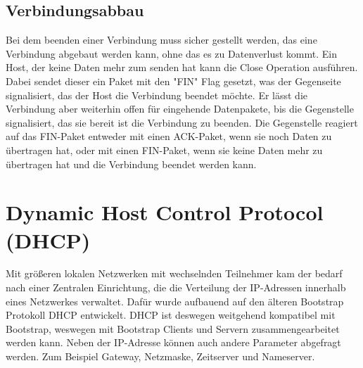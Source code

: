 \subsection{Verbindungsabbau}
Bei dem beenden einer Verbindung muss sicher gestellt werden, das eine Verbindung abgebaut werden kann, ohne das es zu Datenverlust kommt. Ein Host, der keine Daten mehr zum senden hat kann die Close Operation ausführen. Dabei sendet dieser ein Paket mit den "FIN"{} Flag gesetzt, was der Gegenseite signalisiert, das der Host die Verbindung beendet möchte. Er lässt die Verbindung aber weiterhin offen für eingehende Datenpakete, bis die Gegenstelle signalisiert, das sie bereit ist die Verbindung zu beenden. Die Gegenstelle reagiert auf das FIN-Paket entweder mit einen ACK-Paket, wenn sie noch Daten zu übertragen hat, oder mit einen FIN-Paket, wenn sie keine Daten mehr zu übertragen hat und die Verbindung beendet werden kann. 

\section{Dynamic Host Control Protocol (DHCP)}
Mit größeren lokalen Netzwerken mit wechselnden Teilnehmer kam der bedarf nach einer Zentralen Einrichtung, die die Verteilung der IP-Adressen innerhalb eines Netzwerkes verwaltet. Dafür wurde aufbauend auf den älteren Bootstrap Protokoll DHCP entwickelt. DHCP ist deswegen weitgehend kompatibel mit Bootstrap, weswegen mit Bootstrap Clients und Servern zusammengearbeitet werden kann. 
Neben der IP-Adresse können auch andere Parameter abgefragt werden. Zum Beispiel Gateway, Netzmaske, Zeitserver und Nameserver. 




